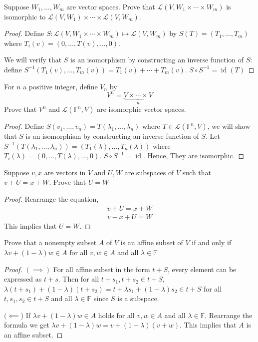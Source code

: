 \begin{exercise}
Suppose $W_1, \ldots , W_m$ are vector spaces. Prove that $\mathcal{L}(V, W_1 \times \cdots \times W_m)$ is isomorphic to $\mathcal{L}(V, W_1) \times \cdots \times \mathcal{L}(V, W_m)$.
\end{exercise}
\begin{proof}
	Define $S: \mathcal{L}(V, W_1\times \cdots\times W_m) \mapsto \mathcal{L}(V,W_m)$ by $S(T) = (T_1, \ldots ,T_m)$ where $T_i(v) = (0, \ldots ,T(v), \ldots ,0)$. 
  \par We will verify that $S$ is an isomorphism by constructing an inverse function of $S$: define
	$S^{-1} (T_1(v), \ldots , T_m(v)) = T_1(v) + \cdots + T_m(v)$. $S \circ S^{-1} = \operatorname{id}(T)$
\end{proof}

\begin{exercise}
For $n $ a positive integer, define $V_n $ by \[
	V^n = \underbrace{ V \times \cdots \times V }_{n}\]
Prove that $V^n$ and $\mathcal{L}(\mathbb{F}^n, V)$ are isomorphic vector spaces.
\end{exercise}
\begin{proof}
	Define $S(v_1, \ldots ,v_n) = T(\lambda_1, \ldots , \lambda_n)$ where $T \in \mathcal{L}(\mathbb{F}^n, V)$, we will show that $S$ is an isomorphism by constructing an inverse function of $S$. Let $S^{-1} (T(\lambda_1, \ldots ,\lambda_n)) = (T_1(\lambda), \ldots , T_n(\lambda))$ where $T_i(\lambda) = (0, \ldots, T(\lambda), \ldots , 0)$. $S \circ S^{-1} = \operatorname{id}$. Hence, They are isomorphic.
\end{proof}

\begin{exercise}
Suppose $v,x$ are vectors in $V$ and $U, W$ are subspaces of $V$ such that $v + U = x + W$. Prove that $U = W$
\end{exercise}
\begin{proof}
	Rearrange the equation,
	\begin{align*}
		v + U = x + W \\
		v - x + U = W
	\end{align*}
	This implies that $U = W$.
\end{proof}

\begin{exercise}
Prove that a nonempty subset $A $ of $V$ is an affine subset of $V$ if and only if
$\lambda v + (1 - \lambda)w \in A$ for all $v, w \in A$ and all $\lambda \in \mathbb{F}$
\end{exercise}
\begin{proof}
	$(\implies)$ For all affine subset in the form $t + S$, every element can be expressed as $t + s$. Then for all $t + s_1, t + s_2 \in t + S$, $\lambda (t + s_1) + (1 - \lambda)(t + s_2) = t + \lambda s_1 + (1 - \lambda)s_2 \in t + S$ for all $t, s_1, s_2 \in t + S$ and all $\lambda \in \mathbb{F}$ since $S $ is a subspace. \par
	$(\impliedby$) If $\lambda v + (1 - \lambda)w \in A$ holds for all $v, w \in A$ and all $\lambda \in \mathbb{F}$. Rearrange the formula we get $\lambda v + (1 - \lambda)w = v + (1 - \lambda)(v+w)$. This implies that $A$ is an affine subset.
\end{proof}

